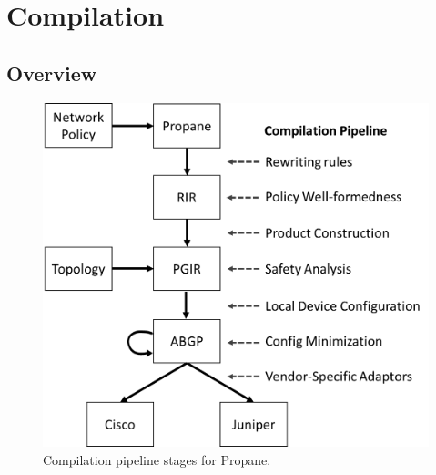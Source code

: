 \section{Compilation}
\label{sec:compilation}





\subsection{Overview}

\begin{figure}[t!]
\centering
\includegraphics[width=\columnwidth]{figures/pipeline}
\caption{Compilation pipeline stages for Propane.}
\label{fig:pipeline}
\end{figure}


